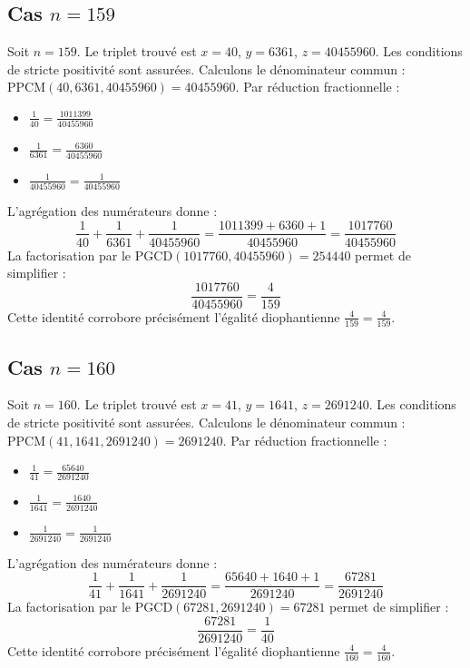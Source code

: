 \documentclass[11pt,a4paper]{article}
\begin{document}
\subsection{Cas $n = 159$}
Soit $n = 159$. Le triplet trouvé est $x = 40$, $y = 6361$, $z = 40455960$.
Les conditions de stricte positivité sont assurées.
Calculons le dénominateur commun : $\text{PPCM}(40, 6361, 40455960) = 40455960$.
Par réduction fractionnelle :
\begin{itemize}
    \item $\frac{1}{40} = \frac{1011399}{40455960}$
    \item $\frac{1}{6361} = \frac{6360}{40455960}$
    \item $\frac{1}{40455960} = \frac{1}{40455960}$
\end{itemize}
L'agrégation des numérateurs donne :
$$ \frac{1}{40} + \frac{1}{6361} + \frac{1}{40455960} = \frac{1011399 + 6360 + 1}{40455960} = \frac{1017760}{40455960} $$
La factorisation par le $\text{PGCD}(1017760, 40455960) = 254440$ permet de simplifier :
$$ \frac{1017760}{40455960} = \frac{4}{159} $$
Cette identité corrobore précisément l'égalité diophantienne $\frac{4}{159} = \frac{4}{159}$.

\subsection{Cas $n = 160$}
Soit $n = 160$. Le triplet trouvé est $x = 41$, $y = 1641$, $z = 2691240$.
Les conditions de stricte positivité sont assurées.
Calculons le dénominateur commun : $\text{PPCM}(41, 1641, 2691240) = 2691240$.
Par réduction fractionnelle :
\begin{itemize}
    \item $\frac{1}{41} = \frac{65640}{2691240}$
    \item $\frac{1}{1641} = \frac{1640}{2691240}$
    \item $\frac{1}{2691240} = \frac{1}{2691240}$
\end{itemize}
L'agrégation des numérateurs donne :
$$ \frac{1}{41} + \frac{1}{1641} + \frac{1}{2691240} = \frac{65640 + 1640 + 1}{2691240} = \frac{67281}{2691240} $$
La factorisation par le $\text{PGCD}(67281, 2691240) = 67281$ permet de simplifier :
$$ \frac{67281}{2691240} = \frac{1}{40} $$
Cette identité corrobore précisément l'égalité diophantienne $\frac{4}{160} = \frac{4}{160}$.
\end{document}
